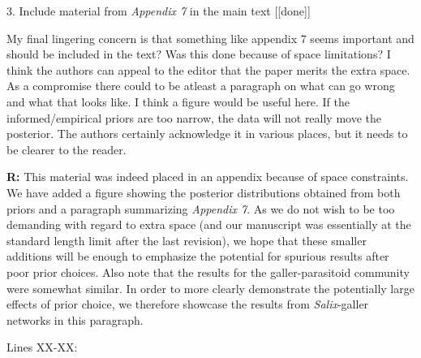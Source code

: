 \documentclass[12pt]{letter}
\newenvironment{refquote}{\bigskip \begin{it}}{\end{it}\smallskip}
\begin{document}
	3. Include material from \emph{Appendix 7} in the main text [[done]]

		\begin{refquote}
		
			My final lingering concern is that something like appendix 7 seems important and should be included in the text? Was this done because of space limitations? I think the authors can appeal to the editor that the paper merits the extra space. As a compromise there could to be atleast a paragraph on what can go wrong and what that looks like. I think a figure would be useful here. If the informed/empirical priors are too narrow, the data will not really move the posterior. The authors certainly acknowledge it in various places, but it needs to be clearer to the reader.

		\end{refquote}


		\textbf{R:} This material was indeed placed in an appendix because of space constraints. We have added a figure showing the posterior distributions obtained from both priors and a paragraph summarizing \emph{Appendix 7}. As we do not wish to be too demanding with regard to extra space (and our manuscript was essentially at the standard length limit after the last revision), we hope that these smaller additions will be enough to emphasize the potential for spurious results after poor prior choices. Also note that the results for the galler-parasitoid community were somewhat similar. In order to more clearly demonstrate the potentially large effects of prior choice, we therefore showcase the results from \emph{Salix}-galler networks in this paragraph.


		Lines XX-XX:
\end{document}

